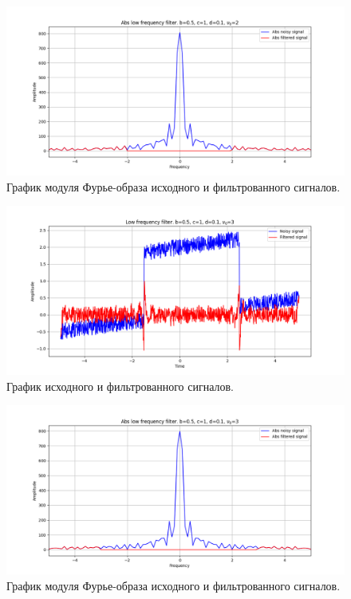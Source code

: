 \documentclass[a4paper, 12pt]{article}
\begin{document}
    \begin{figure}[!htb]
        \centering
        \includegraphics[scale=0.485]{11_abs_u_U_nolow.png}
        \captionsetup{skip=0pt}
        \caption{График модуля Фурье-образа исходного и фильтрованного сигналов.}
        \label{fig:fig48}
    \end{figure}
    \begin{figure}[!htb]
        \centering
        \includegraphics[scale=0.485]{12_u_flt_u_nolow.png}
        \captionsetup{skip=0pt}
        \caption{График исходного и фильтрованного сигналов.}
        \label{fig:fig49}
    \end{figure}
    \begin{figure}[!htb]
        \centering
        \includegraphics[scale=0.485]{12_abs_u_U_nolow.png}
        \captionsetup{skip=0pt}
        \caption{График модуля Фурье-образа исходного и фильтрованного сигналов.}
        \label{fig:fig50}
    \end{figure}
\end{document}
